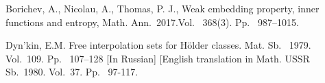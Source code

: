 \documentclass[12pt]{llncs}
\begin{document}


\begin{thebibliography}{9} %


Borichev, A., Nicolau, A.,  Thomas, P. J., Weak embedding property, inner functions and entropy,
 Math. Ann.~2017.Vol. ~368(3). Pp.~ 987--1015.
 
Dyn'kin, E.M. Free interpolation sets for H\"{o}lder classes. Mat. Sb.  ~1979. Vol.~109. Pp.~ 107--128  [In Russian]
[English translation in Math. USSR Sb.~1980. Vol.~37. Pp.~ 97-117.




\end{thebibliography}

\end{document}
